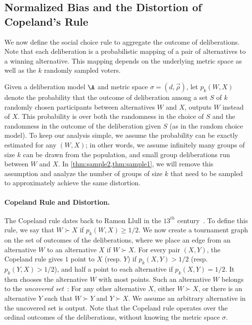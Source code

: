 
\subsection{Normalized Bias and the Distortion of Copeland's Rule}
\label{sec:copeland}
We now define the social choice rule to aggregate the outcome of deliberations. Note that each deliberation is a probabilistic mapping of a pair of alternatives to a winning alternative. This mapping depends on the underlying metric space as well as the $k$ randomly sampled voters.

Given a deliberation model $\A$ and metric space $\sigma = (d, \vec{\rho})$, let $p_k(W,X)$ denote the probability that the outcome of deliberation among a set $S$ of $k$ randomly chosen participants between alternatives $W$ and $X$, outputs $W$ instead of $X$. This probability is over both the randomness in the choice of $S$ and the randomness in the outcome of the deliberation given $S$ (as in the random choice model). To keep our analysis simple, we assume the probability can be exactly estimated for any $(W,X)$; in other words, we assume infinitely many groups of size $k$ can be drawn from the population, and small group deliberations  run  between $W$ and $X$.  In \cref{thm:sample2,thm:sample1}, we will remove this assumption and analyze the number of groups of size $k$ that need to be sampled to approximately achieve the same distortion.

\paragraph{Copeland Rule and Distortion.} The Copeland rule dates back to Ramon Llull in the $13^{th}$ century~\cite{voting-book}. To define this rule, we say that $W \succ X$ if $p_k(W,X) \ge 1/2$.  We now create a tournament graph on the set of outcomes of the deliberations, where we place an edge from an alternative $W$ to an alternative $X$ if $W \succ X$. For every pair $(X,Y)$, the Copeland rule gives $1$ point to $X$ (resp. $Y$) if $p_k(X,Y) > 1/2$ (resp. $p_k(Y,X) > 1/2$), and half a point to each alternative if $p_k(X,Y) = 1/2$. It then chooses the alternative $W$ with most points.  Such an alternative $W$ belongs to the {\em uncovered set}~\cite{landau}: For any other alternative $X$, either $W \succ X$, or there is an alternative $Y$ such that $W \succ Y$ and $Y \succ X$. We assume an arbitrary alternative in the uncovered set is output. Note that the Copeland rule operates over the ordinal outcomes of the deliberations, without knowing the metric space $\sigma$.

